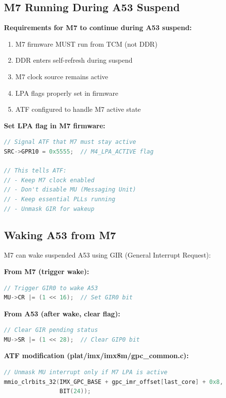 \documentclass[12pt,a4paper]{report}
\begin{document}
\subsection{M7 Running During A53 Suspend}

\textbf{Requirements for M7 to continue during A53 suspend:}
\begin{enumerate}
    \item M7 firmware MUST run from TCM (not DDR)
    \item DDR enters self-refresh during suspend
    \item M7 clock source remains active
    \item LPA flags properly set in firmware
    \item ATF configured to handle M7 active state
\end{enumerate}

\textbf{Set LPA flag in M7 firmware:}
\begin{lstlisting}[language=c]
// Signal ATF that M7 must stay active
SRC->GPR10 = 0x5555;  // M4_LPA_ACTIVE flag

// This tells ATF:
// - Keep M7 clock enabled
// - Don't disable MU (Messaging Unit)
// - Keep essential PLLs running
// - Unmask GIR for wakeup
\end{lstlisting}

\subsection{Waking A53 from M7}

M7 can wake suspended A53 using GIR (General Interrupt Request):

\textbf{From M7 (trigger wake):}
\begin{lstlisting}[language=c]
// Trigger GIR0 to wake A53
MU->CR |= (1 << 16);  // Set GIR0 bit
\end{lstlisting}

\textbf{From A53 (after wake, clear flag):}
\begin{lstlisting}[language=c]
// Clear GIR pending status
MU->SR |= (1 << 28);  // Clear GIP0 bit
\end{lstlisting}

\textbf{ATF modification (plat/imx/imx8m/gpc\_common.c):}
\begin{lstlisting}[language=c]
// Unmask MU interrupt only if M7 LPA is active
mmio_clrbits_32(IMX_GPC_BASE + gpc_imr_offset[last_core] + 0x8, 
                BIT(24));
\end{lstlisting}
\end{document}
